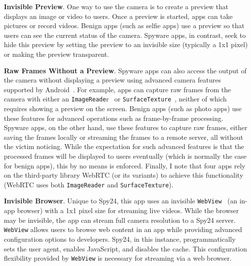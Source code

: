 
\textbf{Invisible Preview}. One way to use the camera is to create a preview that displays an image or video to users. Once a preview is started, apps can take pictures or record videos. Benign apps (such as selfie apps) use a preview so that users can see the current status of the camera. Spyware apps, in contrast, seek to hide this preview by setting the preview to an invisible size (typically a 1x1 pixel) or making the preview transparent.

\textbf{Raw Frames Without a Preview}.
Spyware apps can also access the output of the camera without displaying a
preview using advanced camera features supported by
Android~\cite{Cameraca74:online}. For example, apps can capture raw frames from
the camera with either an \texttt{ImageReade}r~\cite{Cameraca74:online} or
\texttt{SurfaceTexture}~\cite{SurfaceT78:online}, neither of which requires showing a
preview on the screen.
Benign apps (such as photo apps) use these
features for advanced operations such as frame-by-frame processing. Spyware
apps, on the other hand, use these features to capture raw frames, either saving
the frames locally or streaming the frames to a remote server, all without the
victim noticing. While the expectation for such advanced features is that the
processed frames will be displayed to users eventually (which is normally the
case for benign apps), this by no means is enforced. Finally, I note that four
apps rely on the third-party library WebRTC (or its variants) to achieve this functionality (WebRTC uses both \texttt{ImageReader} and \texttt{SurfaceTexture}).


\textbf{Invisible Browser}. Unique to Spy24, this app uses an invisible
\texttt{WebView}~\cite{WebViewA25:online} (an in-app browser) with a 1x1 pixel size for
streaming live videos. While the browser may be invisible, the app can stream
full camera resolution to a Spy24 server.
\texttt{WebView} allows users to browse web content in an app while providing advanced
configuration options to developers. Spy24, in this instance, programmatically sets
the user agent, enables JavaScript, and disables the cache. This configuration
flexibility provided by \texttt{WebView} is necessary for streaming via a web browser.

